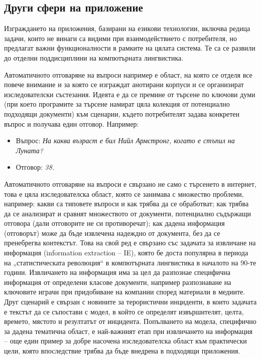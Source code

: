 \begin{multicols}{2}
  \subsection{Други сфери на приложение}

  Изграждането на приложения, базирани на езикови технологии, включва редица задачи, които не винаги са видими при взаимодействието с потребителя,
   но предлагат важни функционалности в рамките на цялата система. Те са се развили до отделни поддисциплини на компютърната лингвистика.

  Автоматичното отговаряне на въпроси например е област, на която се отделя все повече внимание и за която се изграждат анотирани корпуси и се организират изследователски състезания. Идеята е да се премине от търсене по ключови думи (при което програмите за търсене намират цяла колекция от потенциално
   подходящи документи) към сценарии, където потребителят задава конкретен въпрос и получава един отговор. Например: 

  \begin{itemize}
  \item[] Въпрос: \textit{На каква възраст е бил Нийл Армстронг, когато е стъпил на Луната?}
  \item[] Отговор: \textit{38.}
  \end{itemize}

  Автоматичното отговаряне на въпроси е свързано не само с търсенето в интернет, това е цяла изследователска област, която се занимава с множество проблеми, например: какви са типовете въпроси и как трябва да се обработват; как трябва да се анализират и сравнят множеството от документи, потенциално
   съдържащи отговора (дали отговорите не си противоречат); как
  дадена информация (отговорът) може да бъде извлечена  надеждно от документа, без да се пренебрегва контекстът.
  Това на свой ред е свързано със задачата за извличане на информация (information extraction -- IE), която бе доста популярна в периода на „статистическата революция“ в компютърната лингвистика в началото на 90-те години. Извличането на информация има за цел да разпознае специфична информация от определени класове документи, например разпознаване на ключовите играчи при
   придобиване на компании според материали в медиите. Друг сценарий е свързан с новините за терористични инциденти, в които задачата е текстът да се съпостави  с модел, в който се определят извършителят, целта, времето, мястото и резултатът от инцидента. Попълването на модела, специфично за дадена тематична област, е най-важният етап при извличането на информация – още
   един пример за добре насочена изследователска област към практически цели, която впоследствие трябва да бъде внедрена в подходящи приложения.


\end{multicols}
